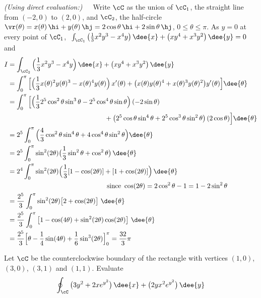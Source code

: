 \begin{solution}
\emph{(Using direct evaluation:)}\ \ \
Write $\cC$ as the union of $\cC_1$, the straight line from
$(-2,0)$ to $(2,0)$, and $\cC_2$, the half-circle $\vr(\theta)=x(\theta)\,\hi+y(\theta)\,\hj=2\cos\theta\,\hi+2\sin\theta\,\hj$,
$0\le\theta\le \pi$. As $y=0$ at every point of $\cC_1$,
$\
\int_{\cC_1} \big(\frac{1}{3}x^2y^3-x^4y\big)\,\dee{x}
+\big(xy^4+x^3y^2\big)\,\dee{y}=0
\ $ and
\begin{align*}
I&=\int_{\cC_2} \Big(\frac{1}{3}x^2y^3-x^4y\Big)\,\dee{x}
+\big(xy^4+x^3y^2\big)\,\dee{y}\\
&=\int_0^\pi\Big[ \Big(\frac{1}{3}x(\theta)^2y(\theta)^3-x(\theta)^4y(\theta)\Big)\,x'(\theta)
+\big(x(\theta)y(\theta)^4+x(\theta)^3y(\theta)^2\big)y'(\theta)\Big]
          \dee{\theta}
\\
&=\int_0^\pi\Big[ \Big(\frac{1}{3}2^5\cos^2\theta\sin^3\theta-2^5\cos^4\theta\sin\theta\Big)\,
                 (-2\sin\theta)
   \\&\hskip2in
+\big(2^5\cos\theta\sin^4\theta+2^5\cos^3\theta\sin^2\theta\big)\,
               (2\cos\theta)\Big]\dee{\theta}\\
&=2^5\int_0^\pi \Big(\frac{4}{3}\cos^2\theta\sin^4\theta+4\cos^4\theta\sin^2\theta\Big)
\dee{\theta}\\
&=2^5\int_0^\pi \sin^2(2\theta)\big(\frac{1}{3}\sin^2\theta+\cos^2\theta\big)\,
\dee{\theta}\\
&=2^4\int_0^\pi \sin^2(2\theta)\Big(\frac{1}{3}[1-\cos(2\theta)]+[1+\cos(2\theta)]\Big)\,
\dee{\theta}\\
  &\hskip2in\hbox{ since }\cos(2\theta)=2\cos^2\theta-1=1-2\sin^2\theta\\
&=\frac{2^5}{3}\int_0^\pi \sin^2(2\theta)\big[2+\cos(2\theta)\big]\ \dee{\theta}\\
&=\frac{2^5}{3}\int_0^\pi \big[1-\cos(4\theta)+\sin^2(2\theta)\cos(2\theta)\big]\ \dee{\theta}\\
&=\frac{2^5}{3} \Big[\theta-\frac{1}{4}\sin(4\theta)+\frac{1}{6}\sin^3(2\theta)\Big]_0^\pi
=\frac{32}{3}\pi
\end{align*}
\end{solution}


\begin{question}[M317 2018A] %
Let $\cC$ be the counterclockwise boundary of the rectangle
with vertices $(1,0)$, $(3,0)$, $(3,1)$ and $(1,1)$. Evaluate
\begin{equation*}
\oint_\cC\big(3y^2+2xe^{y^2}\big)\,\dee{x} + \big(2yx^2 e^{y^2}\big)\,\dee{y}
\end{equation*}
\end{question}

